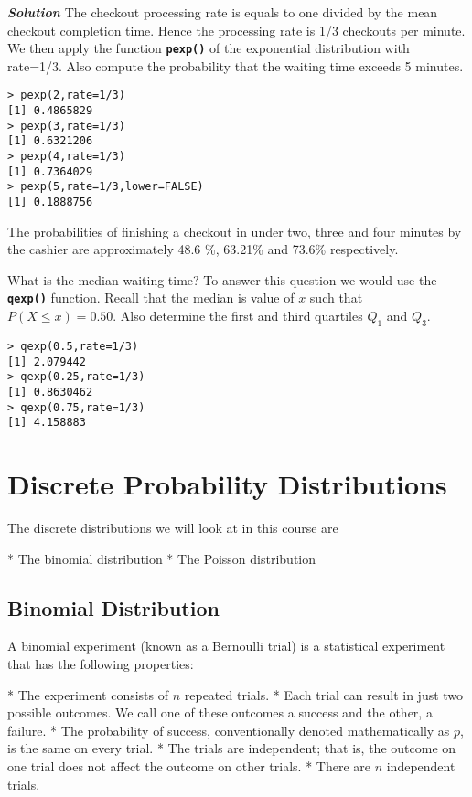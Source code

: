 \textbf{\emph{Solution}} The checkout processing rate is equals to one divided by the mean checkout completion time. 
Hence the processing rate is 1/3 checkouts per minute. We then apply the function \texttt{\textbf{pexp()}} of the exponential distribution with rate=1/3. 
Also compute the probability that the waiting time exceeds 5 minutes.
\begin{verbatim}
> pexp(2,rate=1/3)
[1] 0.4865829
> pexp(3,rate=1/3)
[1] 0.6321206
> pexp(4,rate=1/3)
[1] 0.7364029
> pexp(5,rate=1/3,lower=FALSE)
[1] 0.1888756
\end{verbatim}
The probabilities of finishing a checkout in under two, three and four minutes by the cashier are approximately 48.6 \%, 63.21\% and 73.6\% respectively. 

What is the median waiting time? To answer this question we would use the \texttt{\textbf{qexp()}} function. Recall that the median is value of $x$ such that $P(X \leq x) = 0.50$.
Also determine the first and third quartiles $Q_1$ and $Q_3$.
\begin{verbatim}
> qexp(0.5,rate=1/3)
[1] 2.079442
> qexp(0.25,rate=1/3)
[1] 0.8630462
> qexp(0.75,rate=1/3)
[1] 4.158883
\end{verbatim}
\newpage


\section{Discrete Probability Distributions}
The discrete distributions we will look at in this course are
\begin{itemize}
*  The binomial distribution
*  The Poisson distribution
\end{itemize}
\subsection{Binomial Distribution}

A binomial experiment (known as a Bernoulli trial) is a statistical experiment that has the following properties: 

\begin{itemize}
* 	The experiment consists of $n$ repeated trials.
* 	Each trial can result in just two possible outcomes. We call one of these outcomes a success and the other, a failure.
* 	The probability of success, conventionally denoted mathematically as $p$, is the same on every trial.
* 	The trials are independent; that is, the outcome on one trial does not affect the outcome on other trials.
* 	There are $n$ independent trials.
\end{itemize}
 

